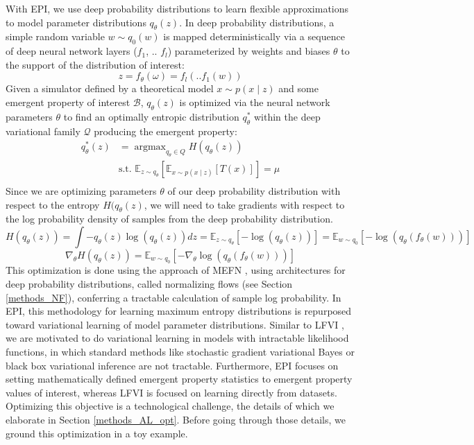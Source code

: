\documentclass[11pt]{article}
\DeclareMathOperator*{\argmax}{argmax}
\begin{document}
With EPI, we use deep probability distributions to learn flexible approximations to model parameter distributions $q_\theta(z)$.
 In deep probability distributions, a simple random variable $w \sim q_0(w)$ is mapped deterministically via a sequence of deep neural network layers ($f_1$, .. $f_l$) parameterized by weights and biases $\theta$ to the support of the distribution of interest:
\begin{equation}
z = f_{\theta}(\omega) = f_l(..f_1(w))
\end{equation}
Given a simulator defined by a theoretical model $x \sim p(x \mid z)$ and some emergent property of interest $\mathcal{B}$, $q_\theta(z)$ is optimized via the neural network parameters $\theta$ to find an optimally entropic distribution $q_{\theta}^*$ within the deep variational family $\mathcal{Q}$ producing the emergent property:
\begin{equation} \label{eq:opt}
\begin{split}
q_\theta^*(z) &= \argmax_{q_\theta \in Q} H(q_\theta(z)) \\
 &  \text{s.t.  } \mathbb{E}_{z \sim q_\theta}\left[ \mathbb{E}_{x\sim p(x \mid z)}\left[T(x)\right] \right] = \mu \\
 \end{split}
\end{equation} 
Since we are optimizing parameters $\theta$ of our deep probability distribution with respect to the entropy $H(q_\theta(z)$, we will need to take gradients with respect to the log probability density of samples from the deep probability distribution.
\begin{equation}
H(q_\theta(z)) = \int - q_\theta(z) \log(q_\theta(z)) dz = \mathbb{E}_{z \sim q_\theta}\left[-\log(q_\theta(z)) \right] = \mathbb{E}_{w \sim q_0}\left[-\log(q_\theta(f_\theta(w))) \right]
\end{equation}
\begin{equation}
\nabla_\theta H(q_\theta(z)) = \mathbb{E}_{w \sim q_0}\left[- \nabla_\theta \log(q_\theta(f_\theta(w))) \right]
\end{equation}
This optimization is done using the approach of MEFN \cite{loaiza2017maximum}, using architectures for deep probability distributions, called normalizing flows (see Section \ref{methods_NF}), conferring a tractable calculation of sample log probability.  In EPI, this methodology for learning maximum entropy distributions is repurposed toward variational learning of model parameter distributions.  
Similar to LFVI \cite{tran2017hierarchical}, we are motivated to do variational learning in models with intractable likelihood functions, in which standard methods like stochastic gradient variational Bayes \cite{kingma2013auto} or black box variational inference\cite{ranganath2014black} are not tractable.  Furthermore, EPI focuses on setting mathematically defined emergent property statistics to emergent property values of interest, whereas LFVI is focused on learning directly from datasets.  Optimizing this objective is a technological challenge, the details of which we elaborate in Section \ref{methods_AL_opt}.  Before going through those details, we ground this optimization in a toy example.
\end{document}
